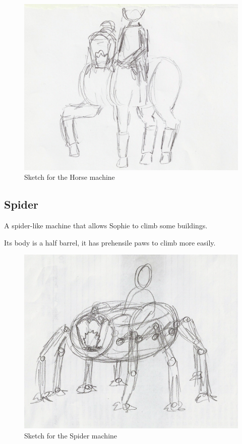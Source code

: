 \begin{figure}[H]
  \centering
  \includegraphics[width=14cm]{Images/Machines/horse}
  \caption{Sketch for the Horse machine}
\end{figure}

\pagebreak

\subsection*{Spider}
A spider-like machine that allows Sophie to climb some buildings.

Its body is a half barrel, it has prehensile paws to climb more easily.

\begin{figure}[H]
  \centering
  \includegraphics[width=14cm]{Images/Machines/spider}
  \caption{Sketch for the Spider machine}
\end{figure}

